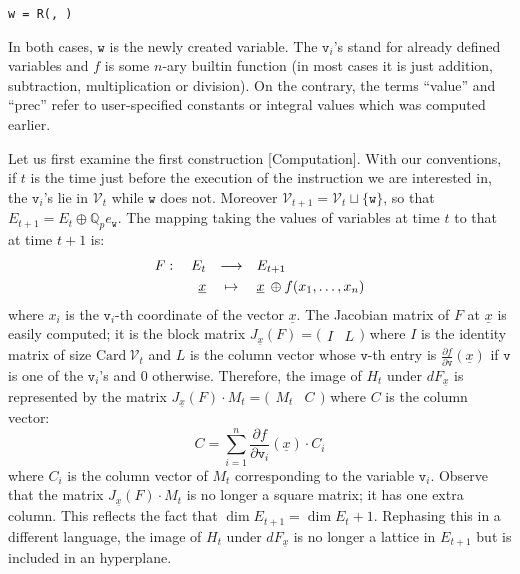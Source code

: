 \documentclass[sigconf]{acmart}
\newcommand{\Q}{\mathbb Q}
\newcommand{\Qp}{\Q_p}
\newcommand{\calV}{\mathcal{V}}
\newcommand{\ttv}{\texttt{v}\xspace}
\newcommand{\ttw}{\texttt{w}\xspace}
\theoremstyle{definition}
\begin{document}
\smallskip

\noindent \hspace{5mm} 
\verb?w = ?\verb?R(?\verb?, ?\verb?)?

\medskip

\noindent
In both cases, $\ttw$ is the newly created variable. 
The $\ttv_i$'s stand for already defined variables and $f$ is some 
$n$-ary builtin function (in most cases it is just addition, 
subtraction, multiplication or division). On the contrary, the terms 
``value'' and ``prec'' refer to user-specified constants or integral 
values which was computed earlier.

\smallskip

Let us first examine the first construction [Computation].
With our conventions, if $t$ is the time just before the execution of 
the instruction we are interested in, the $\ttv_i$'s lie in $\calV_t$ 
while $\ttw$ does not. Moreover $\calV_{t+1} = \calV_t \sqcup \{\ttw\}$, 
so that $E_{t+1} = E_t \oplus \Qp e_\ttw$.
The mapping taking the values of variables at time $t$ to that at 
time $t{+}1$ is:
$$\begin{array}{rcl}
F: \quad E_t & \longrightarrow & E_{t+1} \smallskip \\
\underline x & \mapsto & \underline x \:\oplus f(x_1, \ldots, x_n)
\end{array}$$
where $x_i$ is the $\ttv_i$-th coordinate of the vector $\underline x$.
The Jacobian matrix of $F$ at $\underline x$ is easily computed; it 
is the block matrix $J_{\underline x}(F) = \big( \begin{matrix} I & L
\end{matrix} \big)$ where $I$ is the identity matrix of size $\text{Card}
\:\calV_t$ and $L$ is the column vector whose $\ttv$-th entry is
$\frac{\partial f}{\partial \ttv} (\underline x)$ if $\ttv$ is one of 
the $\ttv_i$'s and $0$ otherwise.
Therefore, the image of $H_t$ under $dF_{\underline x}$ is represented 
by the matrix $J_{\underline x}(F) \cdot M_t = \big( \begin{matrix} M_t & C
\end{matrix} \big)$ where $C$ is the column vector:
\begin{equation}
\label{eq:defC}
C = \sum_{i=1}^n \frac{\partial f}{\partial{\ttv_i}} (\underline x)
\cdot C_i
\end{equation}
where $C_i$ is the column vector of $M_t$ corresponding to the
variable $\ttv_i$.
Observe that the matrix $J_{\underline x}(F) \cdot M_t$ is no longer a 
square matrix; it has one extra column. This reflects the fact that 
$\dim E_{t+1} = \dim E_t + 1$. Rephasing this in a different language, 
the image of $H_t$ under $dF_{\underline x}$ is no longer a lattice in 
$E_{t+1}$ but is included in an hyperplane.
\end{document}

